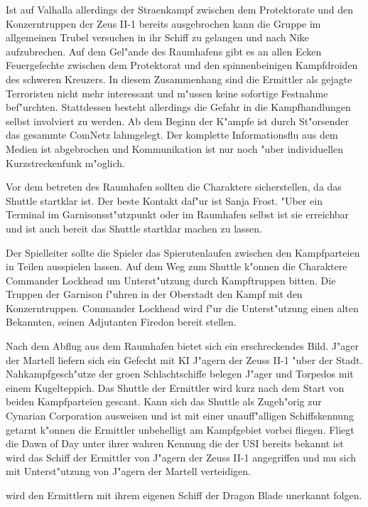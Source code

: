 Ist auf Valhalla allerdings der Stra\3enkampf zwischen dem Protektorate und den Konzerntruppen der Zeus II-1 bereits 
ausgebrochen kann die Gruppe im allgemeinen Trubel versuchen in ihr Schiff zu gelangen und nach Nike aufzubrechen. 
Auf dem Gel"ande des Raumhafens gibt es an allen Ecken Feuergefechte zwischen dem Protektorat und den spinnenbeinigen 
Kampfdroiden des schweren Kreuzers. In diesem Zusammenhang sind die Ermittler als gejagte Terroristen nicht mehr 
interessant und  m"ussen keine sofortige  Festnahme bef"urchten. Stattdessen besteht allerdings die Gefahr in die Kampfhandlungen 
selbst involviert zu werden. Ab dem Beginn der K"ampfe ist durch St"orsender das gesammte ComNetz lahmgelegt. Der komplette
Informationsflu\3 aus dem Medien ist abgebrochen und Kommunikation ist nur noch "uber individuellen Kurzstreckenfunk
m"oglich.

Vor dem betreten des Raumhafen sollten die Charaktere sicherstellen, da\3 das Shuttle startklar ist. Der beste Kontakt
daf"ur ist Sanja Frost. "Uber ein Terminal im Garnisonsst"utzpunkt oder im Raumhafen selbst ist sie erreichbar und ist
auch bereit das Shuttle startklar machen zu lassen.

Der Spielleiter sollte die Spieler das Spie\3rutenlaufen zwischen den Kampfparteien in Teilen ausspielen lassen. Auf 
dem Weg zum Shuttle k"onnen die Charaktere Commander Lockhead um Unterst"utzung durch Kampftruppen bitten. Die Truppen der Garnison f"uhren in der Oberstadt den Kampf mit den Konzerntruppen. Commander Lockhead wird f"ur die Unterst"utzung einen alten Bekannten, seinen Adjutanten Firedon bereit stellen.

Nach dem Abflug aus dem Raumhafen bietet sich ein erschreckendes Bild. J"ager der Martell liefern sich ein Gefecht mit
KI J"agern der Zeuss II-1 "uber der Stadt. Nahkampfgesch"utze der gro\3en Schlachtschiffe belegen J"ager und Torpedos mit
einem Kugelteppich. Das Shuttle der Ermittler wird kurz nach dem Start von beiden Kampfparteien gescant. Kann sich das 
Shuttle als Zugeh"orig zur Cynarian Corporation ausweisen und ist mit einer unauff"alligen Schiffskennung getarnt k"onnen 
die Ermittler unbehelligt am Kampfgebiet vorbei fliegen. Fliegt die Dawn of Day unter ihrer wahren Kennung die der USI bereits bekannt ist  wird das Schiff der Ermittler von J"agern der Zeuss II-1 angegriffen und mu\3 sich mit Unterst"utzung von J"agern der Martell verteidigen.

\xl{} wird den Ermittlern mit ihrem eigenen Schiff der Dragon Blade unerkannt folgen.

